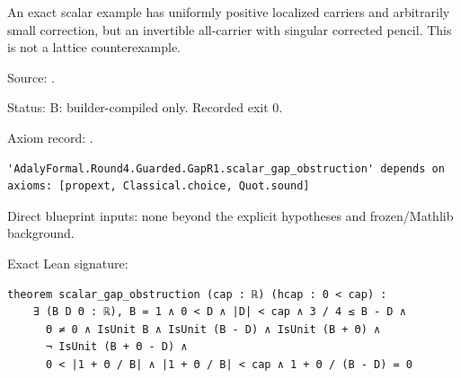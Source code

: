 \begin{theorem}[bp-038]
\label{bp-038}
\uses{}
\leanok
An exact scalar example has uniformly positive localized carriers and arbitrarily small correction, but an invertible all-carrier with singular corrected pencil. This is not a lattice counterexample.

\par Source: \texttt{}.
\par Status: B: builder-compiled only. Recorded exit 0.
\par Axiom record: \texttt{}.
\begin{verbatim}
'AdalyFormal.Round4.Guarded.GapR1.scalar_gap_obstruction' depends on axioms: [propext, Classical.choice, Quot.sound]
\end{verbatim}
\par Direct blueprint inputs: none beyond the explicit hypotheses and frozen/Mathlib background.
\par Exact Lean signature:
\begin{verbatim}
theorem scalar_gap_obstruction (cap : ℝ) (hcap : 0 < cap) :
    ∃ (B D Θ : ℝ), B = 1 ∧ 0 < D ∧ |D| < cap ∧ 3 / 4 ≤ B - D ∧
      Θ ≠ 0 ∧ IsUnit B ∧ IsUnit (B - D) ∧ IsUnit (B + Θ) ∧
      ¬ IsUnit (B + Θ - D) ∧
      0 < |1 + Θ / B| ∧ |1 + Θ / B| < cap ∧ 1 + Θ / (B - D) = 0
\end{verbatim}
\end{theorem}

